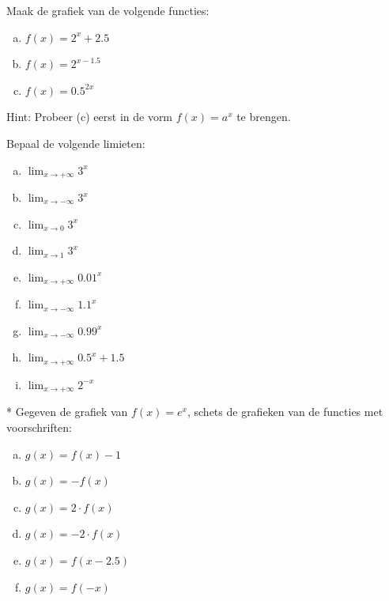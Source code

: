 \documentclass[12pt,twoside]{article}
\begin{document}
\begin{oefening}
Maak de grafiek van de volgende functies:
\begin{multicols}{3}
\begin{enumerate}[(a)]
  \itemsep.5em
  \item $f(x)=2^x+2.5$
  \item $f(x)=2^{x-1.5}$
  \item $f(x)=0.5^{2x}$
\end{enumerate}
\end{multicols}
Hint: Probeer (c) eerst in de vorm $f(x)=a^x$ te brengen.
\end{oefening}

\begin{oefening}
Bepaal de volgende limieten:
\begin{multicols}{3}
\begin{enumerate}[(a)]
  \itemsep.5em
  \item $\displaystyle\lim_{x\to+\infty}3^x$
  \item $\displaystyle\lim_{x\to-\infty}3^x$
  \item $\displaystyle\lim_{x\to0}3^x$
  \item $\displaystyle\lim_{x\to1}3^x$
  \item $\displaystyle\lim_{x\to+\infty}0.01^x$
  \item $\displaystyle\lim_{x\to-\infty}1.1^x$
  \item $\displaystyle\lim_{x\to-\infty}0.99^x$
  \item $\displaystyle\lim_{x\to+\infty}0.5^x+1.5$
  \item $\displaystyle\lim_{x\to+\infty}2^{-x}$
\end{enumerate}
\end{multicols}
\end{oefening}

\begin{oefening}*
Gegeven de grafiek van $f(x)=e^x$, schets de grafieken van de functies met voorschriften:
\begin{multicols}{3}
\begin{enumerate}[(a)]
  \itemsep.5em
  \item $g(x)=f(x)-1$
  \item $g(x)=-f(x)$
  \item $g(x)=2\cdot f(x)$
  \item $g(x)=-2\cdot f(x)$
  \item $g(x)=f(x-2.5)$
  \item $g(x)=f(-x)$
\end{enumerate}
\end{multicols}
\end{oefening}
\end{document}
